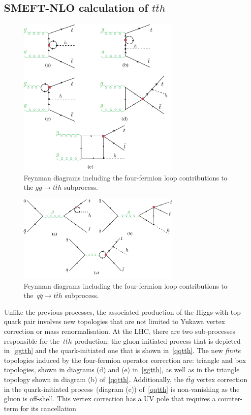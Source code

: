 	\subsection{SMEFT-NLO calculation of  $t\bar th$}
	\begin{figure}[h!]
		\centering
		\includegraphics[width=8cm]{./fig/ggttH-4F_NLO}
		\caption{Feynman diagrams including the four-fermion loop contributions to the $ gg \to t\bar{t} h$ subprocess.}
		\label{ggtth}
	\end{figure}
	\begin{figure}[hth]
		\centering
		\includegraphics[width=8cm]{./fig/qqttH-4F_NLO}
		\caption{Feynman diagrams including the four-fermion loop contributions to the~$ q \bar{q} \to t\bar{t} h$ subprocess.}
		\label{qqtth}
	\end{figure}
	\par Unlike the previous processes, the associated production of the Higgs with top quark pair involves new topologies that are not limited to Yukawa vertex correction or mass renormalisation.  At the LHC, there are two sub-processes responsible for the~$t\bar t h$ production: the gluon-initiated process that is depicted in~\autoref{ggtth} and the quark-initiated one that is shown  in~\autoref{qqtth}. The new \emph{finite} topologies induced by the four-fermion operator correction are: triangle and box topologies, shown in diagrams (d) and (e) in~\autoref{ggtth}, as well as in the triangle topology shown in diagram (b)  of~\autoref{qqtth}.  Additionally, the $t\bar t g$ vertex correction in the quark-initiated process~(diagram (c)) of~\autoref{qqtth} is non-vanishing as the gluon is off-shell. This vertex correction has a UV pole that requires a counter-term for its cancellation
